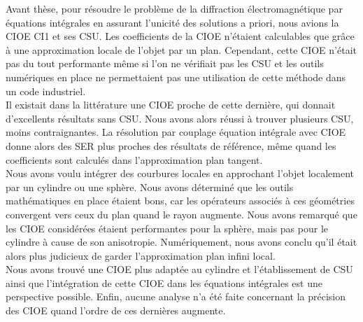 
Avant thèse, pour résoudre le problème de la diffraction électromagnétique par équations intégrales en assurant l'unicité des solutions a priori, nous avions la CIOE CI1 et ses CSU.
Les coefficients de la CIOE n'étaient calculables que grâce à une approximation locale de l'objet par un plan.
Cependant, cette CIOE n'était pas du tout performante même si l’on ne vérifiait pas les CSU et les outils numériques en place ne permettaient pas une utilisation de cette méthode dans un code industriel.
\\

Il existait dans la littérature une CIOE proche de cette dernière, qui donnait d'excellents résultats sans CSU.
Nous avons alors réussi à trouver plusieurs CSU, moins contraignantes.
La résolution par couplage équation intégrale avec CIOE donne alors des SER plus proches des résultats de référence, même quand les coefficients sont calculés dans l'approximation plan tangent.
\\

Nous avons voulu intégrer des courbures locales en approchant l'objet localement par un cylindre ou une sphère.
Nous avons déterminé que les outils mathématiques en place étaient bons, car les opérateurs associés à ces géométries convergent vers ceux du plan quand le rayon augmente.
Nous avons remarqué que les CIOE considérées étaient performantes pour la sphère, mais pas pour le cylindre à cause de son anisotropie.
Numériquement, nous avons conclu qu'il était alors plus judicieux de garder l’approximation plan infini local.
\\

Nous avons trouvé une CIOE plus adaptée au cylindre et l'établissement de CSU ainsi que l'intégration de cette CIOE dans les équations intégrales est une perspective possible.
Enfin, aucune analyse n'a été faite concernant la précision des CIOE quand l'ordre de ces dernières augmente.
